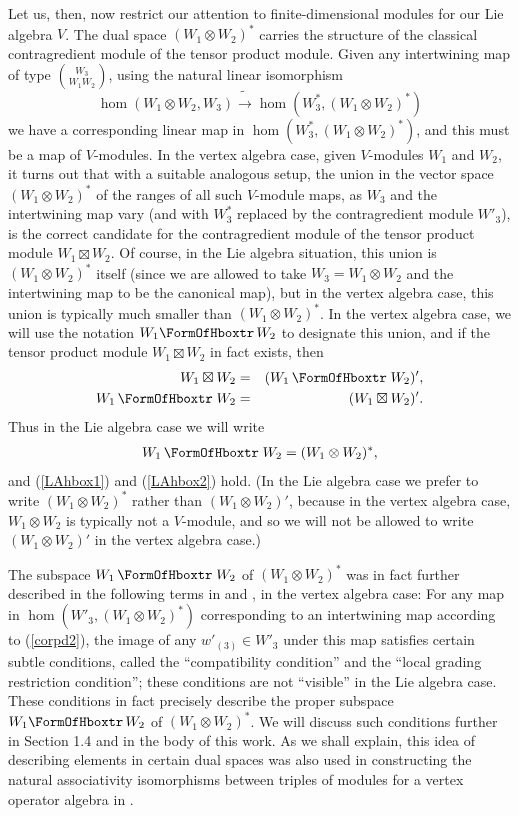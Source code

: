 \documentclass[12pt]{article}
\begin{document}
Let us, then, now restrict our attention to finite-dimensional modules
for our Lie algebra $V$.  The dual space $(W_1\otimes W_2)^*$ carries
the structure of the classical contragredient module of the tensor
product module.  Given any intertwining map of type ${W_3 \choose {W_1
W_2}}$, using the natural linear isomorphism
\begin{equation}\label{corpd2}
\hom (W_1\otimes W_2, W_3)\tilde{\longrightarrow} \hom (W^*_3,
(W_1\otimes W_2)^*)
\end{equation}
we have a corresponding linear map in $\hom (W^*_3, (W_1\otimes
W_2)^*)$, and this must be a map of $V$-modules.  In the vertex
algebra case, given $V$-modules $W_1$ and $W_2$, it turns out that
with a suitable analogous setup, the union in the vector space
$(W_1\otimes W_2)^*$ of the ranges of all such $V$-module maps, as
$W_3$ and the intertwining map vary (and with $W^*_3$ replaced by the
contragredient module $W'_3$), is the correct candidate for the
contragredient module of the tensor product module $W_1\boxtimes W_2$.
Of course, in the Lie algebra situation, this union is $(W_1\otimes
W_2)^*$ itself (since we are allowed to take $W_3=W_1\otimes W_2$ and
the intertwining map to be the canonical map), but in the vertex
algebra case, this union is typically much smaller than $(W_1\otimes
W_2)^*$.  In the vertex algebra case, we will use the notation $W_1
\hboxtr \, W_2$ to designate this union, and if the tensor product
module $W_1\boxtimes W_2$ in fact exists, then
\begin{eqnarray}
W_1 \boxtimes W_2 &=& (W_1 \,\hboxtr \; W_2)',\label{LAhbox1}\\
W_1 \,\hboxtr \; W_2 &=& (W_1 \boxtimes W_2)'.\label{LAhbox2}
\end{eqnarray}
Thus in the Lie algebra case we will write
\begin{eqnarray}
W_1 \,\hboxtr \; W_2 = (W_1 \otimes W_2)^*,
\end{eqnarray}
and (\ref{LAhbox1}) and (\ref{LAhbox2}) hold.  (In the Lie algebra
case we prefer to write $(W_1 \otimes W_2)^*$ rather than $(W_1
\otimes W_2)'$, because in the vertex algebra case, $W_1 \otimes W_2$
is typically not a $V$-module, and so we will not be allowed to write
$(W_1 \otimes W_2)'$ in the vertex algebra case.)

The subspace $W_1 \,\hboxtr \; W_2$ of $(W_1\otimes W_2)^*$ was in
fact further described in the following terms in \cite{tensor1} and
\cite{tensor3}, in the vertex algebra case: For any map in $\hom
(W'_3, (W_1\otimes W_2)^*)$ corresponding to an intertwining map
according to (\ref{corpd2}), the image of any $w'_{(3)}\in W'_3$ under
this map satisfies certain subtle conditions, called the
``compatibility condition'' and the ``local grading restriction
condition''; these conditions are not ``visible'' in the Lie algebra
case.  These conditions in fact precisely describe the proper subspace
$W_1 \hboxtr \, W_2$ of $(W_1\otimes W_2)^*$.  We will discuss such
conditions further in Section 1.4 and in the body of this work.  As we
shall explain, this idea of describing elements in certain dual spaces
was also used in constructing the natural associativity isomorphisms
between triples of modules for a vertex operator algebra in
\cite{tensor4}.
\end{document}
